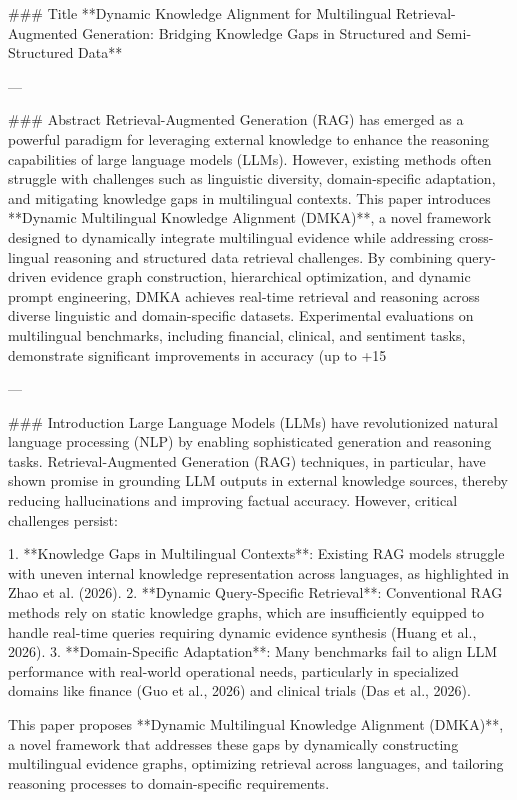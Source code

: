 ### Title  
**Dynamic Knowledge Alignment for Multilingual Retrieval-Augmented Generation: Bridging Knowledge Gaps in Structured and Semi-Structured Data**

---

### Abstract  
Retrieval-Augmented Generation (RAG) has emerged as a powerful paradigm for leveraging external knowledge to enhance the reasoning capabilities of large language models (LLMs). However, existing methods often struggle with challenges such as linguistic diversity, domain-specific adaptation, and mitigating knowledge gaps in multilingual contexts. This paper introduces **Dynamic Multilingual Knowledge Alignment (DMKA)**, a novel framework designed to dynamically integrate multilingual evidence while addressing cross-lingual reasoning and structured data retrieval challenges. By combining query-driven evidence graph construction, hierarchical optimization, and dynamic prompt engineering, DMKA achieves real-time retrieval and reasoning across diverse linguistic and domain-specific datasets. Experimental evaluations on multilingual benchmarks, including financial, clinical, and sentiment tasks, demonstrate significant improvements in accuracy (up to +15%

---

### Introduction  
Large Language Models (LLMs) have revolutionized natural language processing (NLP) by enabling sophisticated generation and reasoning tasks. Retrieval-Augmented Generation (RAG) techniques, in particular, have shown promise in grounding LLM outputs in external knowledge sources, thereby reducing hallucinations and improving factual accuracy. However, critical challenges persist:

1. **Knowledge Gaps in Multilingual Contexts**: Existing RAG models struggle with uneven internal knowledge representation across languages, as highlighted in Zhao et al. (2026).
2. **Dynamic Query-Specific Retrieval**: Conventional RAG methods rely on static knowledge graphs, which are insufficiently equipped to handle real-time queries requiring dynamic evidence synthesis (Huang et al., 2026).
3. **Domain-Specific Adaptation**: Many benchmarks fail to align LLM performance with real-world operational needs, particularly in specialized domains like finance (Guo et al., 2026) and clinical trials (Das et al., 2026).

This paper proposes **Dynamic Multilingual Knowledge Alignment (DMKA)**, a novel framework that addresses these gaps by dynamically constructing multilingual evidence graphs, optimizing retrieval across languages, and tailoring reasoning processes to domain-specific requirements.

